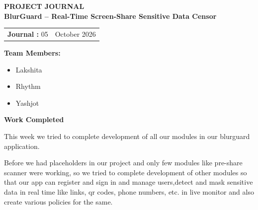 \documentclass[12pt,a4paper]{article}
\begin{document}

\begin{center}
    {\Large \textbf{PROJECT JOURNAL }}\\[10pt]

    {\large \textbf{BlurGuard -- Real-Time Screen-Share Sensitive Data Censor}}
\end{center}

\vspace{10pt}


\begin{tabular}{@{}p{}p{}@{}}
\textbf{Journal :} 05 &
\raggedleft \textbf{} October 2026
\end{tabular}

\vspace{12pt}


\textbf{Team Members:}

\begin{itemize}[leftmargin=1.5cm]
    \item Lakshita
    \item Rhythm
    \item Yashjot
\end{itemize}

\vspace{5pt}


\textbf{\large Work Completed}

\vspace{4pt}
This week we tried to complete development of all our modules in our blurguard application.

Before we had placeholders in our project and only few modules like pre-share scanner were working, so we tried to complete development of other modules so that our app can register and sign in and manage users,detect and mask sensitive data in real time like links, qr codes, phone numbers, etc. in live monitor and also create various policies for the same.

\vspace{8pt}
\end{document}
